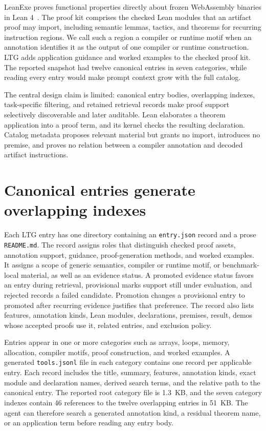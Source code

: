 \documentclass[10pt]{article}
\begin{document}
LeanExe proves functional properties directly about frozen WebAssembly binaries in Lean 4~\cite{deMoura2021Lean4,LeanExeSoftware}.  The proof kit comprises the checked Lean modules that an artifact proof may import, including semantic lemmas, tactics, and theorems for recurring instruction regions.  We call such a region a compiler or runtime motif when an annotation identifies it as the output of one compiler or runtime construction.  LTG adds application guidance and worked examples to the checked proof kit.  The reported snapshot had twelve canonical entries in seven categories, while reading every entry would make prompt context grow with the full catalog.

The central design claim is limited: canonical entry bodies, overlapping indexes, task-specific filtering, and retained retrieval records make proof support selectively discoverable and later auditable.  Lean elaborates a theorem application into a proof term, and its kernel checks the resulting declaration.  Catalog metadata proposes relevant material but grants no import, introduces no premise, and proves no relation between a compiler annotation and decoded artifact instructions.

\section{Canonical entries generate overlapping indexes}

Each LTG entry has one directory containing an \texttt{entry.json} record and a prose \texttt{README.md}.  The record assigns roles that distinguish checked proof assets, annotation support, guidance, proof-generation methods, and worked examples.  It assigns a scope of generic semantics, compiler or runtime motif, or benchmark-local material, as well as an evidence status.  A promoted evidence status favors an entry during retrieval, provisional marks support still under evaluation, and rejected records a failed candidate.  Promotion changes a provisional entry to promoted after recurring evidence justifies that preference.  The record also lists features, annotation kinds, Lean modules, declarations, premises, result, demos whose accepted proofs use it, related entries, and exclusion policy.

Entries appear in one or more categories such as arrays, loops, memory, allocation, compiler motifs, proof construction, and worked examples.  A generated \texttt{tools.jsonl} file in each category contains one record per applicable entry.  Each record includes the title, summary, features, annotation kinds, exact module and declaration names, derived search terms, and the relative path to the canonical entry.  The reported root category file is 1.3~KB, and the seven category indexes contain 46 references to the twelve overlapping entries in 51~KB.  The agent can therefore search a generated annotation kind, a residual theorem name, or an application term before reading any entry body.
\end{document}
